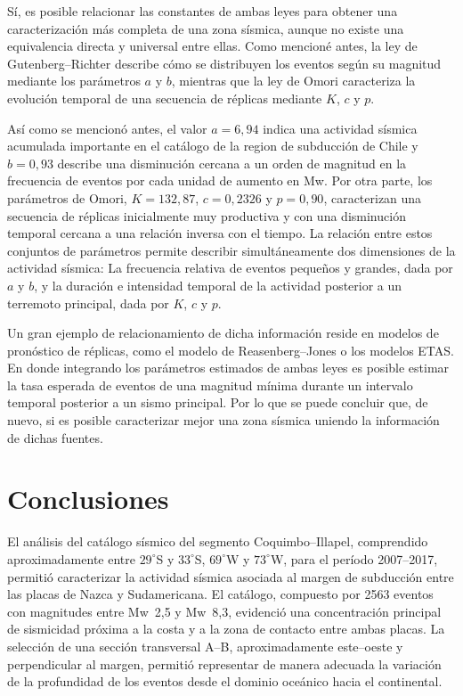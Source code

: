 \documentclass[a4paper,12pt]{article} %
\numberwithin{equation}{section} %
\numberwithin{figure}{section} %
\begin{document}
Sí, es posible relacionar las constantes de ambas leyes para obtener una caracterización más completa de una zona sísmica, aunque no existe una equivalencia directa y universal entre ellas. Como mencioné antes, la ley de Gutenberg--Richter describe cómo se distribuyen los eventos según su magnitud mediante los parámetros $a$ y $b$, mientras que la ley de Omori caracteriza la evolución temporal de una secuencia de réplicas mediante $K$, $c$ y $p$.

Así como se mencionó antes, el valor $a=6{,}94$ indica una actividad sísmica acumulada importante en el catálogo de la region de subducción de Chile y $b=0{,}93$ describe una disminución cercana a un orden de magnitud en la frecuencia de eventos por cada unidad de aumento en Mw. Por otra parte, los parámetros de Omori, $K=132{,}87$, $c=0{,}2326$ y $p=0{,}90$, caracterizan una secuencia de réplicas inicialmente muy productiva y con una disminución temporal cercana a una relación inversa con el tiempo. La relación entre estos conjuntos de parámetros permite describir simultáneamente dos dimensiones de la actividad sísmica: La frecuencia relativa de eventos pequeños y grandes, dada por $a$ y $b$, y la duración e intensidad temporal de la actividad posterior a un terremoto principal, dada por $K$, $c$ y $p$.

Un gran ejemplo de relacionamiento de dicha información reside en modelos de pronóstico de réplicas, como el modelo de Reasenberg--Jones o los modelos ETAS. En donde integrando los parámetros estimados de ambas leyes es posible estimar la tasa esperada de eventos de una magnitud mínima durante un intervalo temporal posterior a un sismo principal. Por lo que se puede concluir que, de nuevo, si es posible caracterizar mejor una zona sísmica uniendo la información de dichas fuentes.

\newpage
\section{Conclusiones}

El análisis del catálogo sísmico del segmento Coquimbo--Illapel, comprendido aproximadamente entre $29^\circ$S y $33^\circ$S, $69^\circ$W y $73^\circ$W, para el período 2007--2017, permitió caracterizar la actividad sísmica asociada al margen de subducción entre las placas de Nazca y Sudamericana. El catálogo, compuesto por 2563 eventos con magnitudes entre Mw~2{,}5 y Mw~8{,}3, evidenció una concentración principal de sismicidad próxima a la costa y a la zona de contacto entre ambas placas. La selección de una sección transversal A--B, aproximadamente este--oeste y perpendicular al margen, permitió representar de manera adecuada la variación de la profundidad de los eventos desde el dominio oceánico hacia el continental.
\end{document}
